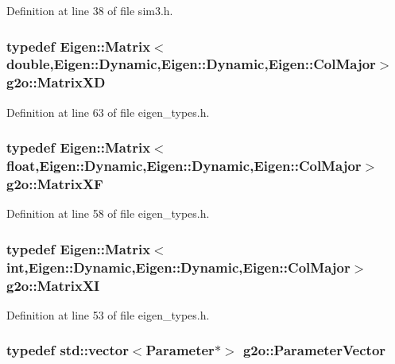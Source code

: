 Definition at line 38 of file sim3.\+h.

\subsubsection[{\texorpdfstring{Matrix\+XD}{MatrixXD}}]{\setlength{\rightskip}{0pt plus 5cm}typedef Eigen\+::\+Matrix$<$double,Eigen\+::\+Dynamic,Eigen\+::\+Dynamic,Eigen\+::\+Col\+Major$>$ {\bf g2o\+::\+Matrix\+XD}}\hypertarget{namespaceg2o_a8a808fe01b0b4e0afe637fe680853d0a}{}\label{namespaceg2o_a8a808fe01b0b4e0afe637fe680853d0a}


Definition at line 63 of file eigen\+\_\+types.\+h.

\subsubsection[{\texorpdfstring{Matrix\+XF}{MatrixXF}}]{\setlength{\rightskip}{0pt plus 5cm}typedef Eigen\+::\+Matrix$<$float,Eigen\+::\+Dynamic,Eigen\+::\+Dynamic,Eigen\+::\+Col\+Major$>$ {\bf g2o\+::\+Matrix\+XF}}\hypertarget{namespaceg2o_a9cf1a3355d8ef3a852aa23866754758c}{}\label{namespaceg2o_a9cf1a3355d8ef3a852aa23866754758c}


Definition at line 58 of file eigen\+\_\+types.\+h.

\subsubsection[{\texorpdfstring{Matrix\+XI}{MatrixXI}}]{\setlength{\rightskip}{0pt plus 5cm}typedef Eigen\+::\+Matrix$<$int,Eigen\+::\+Dynamic,Eigen\+::\+Dynamic,Eigen\+::\+Col\+Major$>$ {\bf g2o\+::\+Matrix\+XI}}\hypertarget{namespaceg2o_a43b1af9ed52619c66479d4820a126aef}{}\label{namespaceg2o_a43b1af9ed52619c66479d4820a126aef}


Definition at line 53 of file eigen\+\_\+types.\+h.

\subsubsection[{\texorpdfstring{Parameter\+Vector}{ParameterVector}}]{\setlength{\rightskip}{0pt plus 5cm}typedef std\+::vector$<${\bf Parameter}$\ast$$>$ {\bf g2o\+::\+Parameter\+Vector}}\hypertarget{namespaceg2o_a85cc8f2c7db8cab47b2b269a7acd6785}{}\label{namespaceg2o_a85cc8f2c7db8cab47b2b269a7acd6785}


